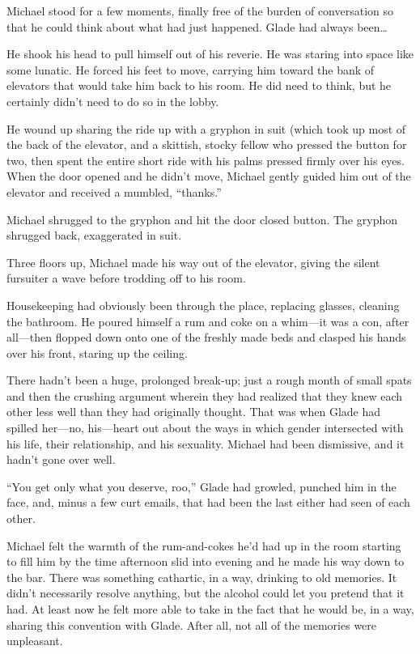 Michael stood for a few moments, finally free of the burden of conversation so that he could think about what had just happened. Glade had always been\ldots{}

He shook his head to pull himself out of his reverie. He was staring into space like some lunatic. He forced his feet to move, carrying him toward the bank of elevators that would take him back to his room. He did need to think, but he certainly didn't need to do so in the lobby.

He wound up sharing the ride up with a gryphon in suit (which took up most of the back of the elevator, and a skittish, stocky fellow who pressed the button for two, then spent the entire short ride with his palms pressed firmly over his eyes. When the door opened and he didn't move, Michael gently guided him out of the elevator and received a mumbled, ``thanks.''

Michael shrugged to the gryphon and hit the door closed button. The gryphon shrugged back, exaggerated in suit.

Three floors up, Michael made his way out of the elevator, giving the silent fursuiter a wave before trodding off to his room.

Housekeeping had obviously been through the place, replacing glasses, cleaning the bathroom. He poured himself a rum and coke on a whim---it was a con, after all---then flopped down onto one of the freshly made beds and clasped his hands over his front, staring up the ceiling.

There hadn't been a huge, prolonged break-up; just a rough month of small spats and then the crushing argument wherein they had realized that they knew each other less well than they had originally thought. That was when Glade had spilled her---no, his---heart out about the ways in which gender intersected with his life, their relationship, and his sexuality. Michael had been dismissive, and it hadn't gone over well.

``You get only what you deserve, roo,'' Glade had growled, punched him in the face, and, minus a few curt emails, that had been the last either had seen of each other.

\secdiv{}

Michael felt the warmth of the rum-and-cokes he'd had up in the room starting to fill him by the time afternoon slid into evening and he made his way down to the bar. There was something cathartic, in a way, drinking to old memories. It didn't necessarily resolve anything, but the alcohol could let you pretend that it had. At least now he felt more able to take in the fact that he would be, in a way, sharing this convention with Glade. After all, not all of the memories were unpleasant.

